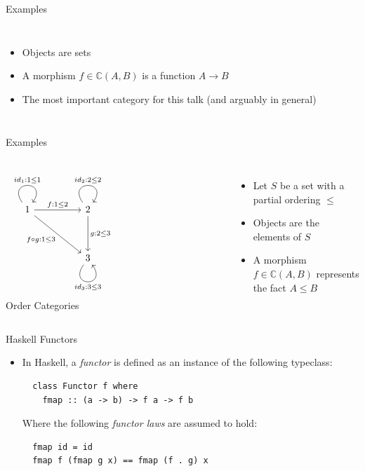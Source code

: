 \documentclass[aspectratio=169]{beamer} %
\newcommand{\bC}{\mathbb{C}}
\begin{document}
{\begin{frame}[fragile]{Examples}
\begin{columns}
\begin{itemize}
 \pause\item Objects are sets
 \pause\item A morphism $f \in \bC(A,B)$ is a function $A \to B$
 \pause\item The most important category for this talk (and arguably in general)
\end{itemize}
\end{columns}
\end{frame}
\begin{frame}[fragile]{Examples}
\begin{columns}
\[\begin{tikzcd}
	1 && 2 \\
	\\
	&& 3 &&&&& {}
	\arrow["{id_1 : 1 \leq 1}", from=1-1, to=1-1, loop, in=55, out=125, distance=10mm]
	\arrow["{f : 1 \leq 2}", from=1-1, to=1-3]
	\arrow["{f \circ g : 1 \leq 3}"', from=1-1, to=3-3]
	\arrow["{id_2 : 2 \leq 2}", from=1-3, to=1-3, loop, in=55, out=125, distance=10mm]
	\arrow["{g : 2 \leq 3}", from=1-3, to=3-3]
	\arrow["{id_3 : 3 \leq 3}"', from=3-3, to=3-3, loop, in=305, out=235, distance=10mm]
\end{tikzcd}\]
Order Categories
\begin{itemize}
 \pause\item Let $S$ be a set with a partial ordering $\leq$
 \pause\item Objects are the elements of $S$
 \pause\item A morphism $f \in \bC(A,B)$ represents the fact $A \leq B$
\end{itemize}
\end{columns}
\end{frame}
%
%
%
\begin{frame}[fragile]{Haskell Functors}
\begin{itemize}
 \item In Haskell, a \textit{functor} is defined as an instance of the following typeclass:
 \pause\begin{verbatim}
  class Functor f where
    fmap :: (a -> b) -> f a -> f b
 \end{verbatim}
 \pause Where the following \textit{functor laws} are assumed to hold:
  \pause \begin{verbatim}
  fmap id = id
  fmap f (fmap g x) == fmap (f . g) x
 \end{verbatim}
\end{itemize}
\end{frame}
%
%
%

}
\end{document}
